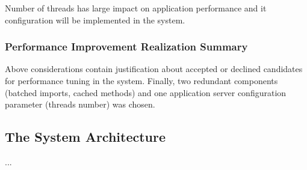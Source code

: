 \documentclass[10pt,a4paper]{article}
\begin{document}
Number of threads has large impact on application performance and it configuration will be implemented in the system. 

\subsubsection{Performance Improvement Realization Summary}

Above considerations contain justification about accepted or declined candidates for performance tuning in the system. Finally, two redundant components (batched imports, cached methods) and one application server configuration parameter (threads number) was chosen.


\subsection{The System Architecture}
...



\pagebreak
\end{document}
